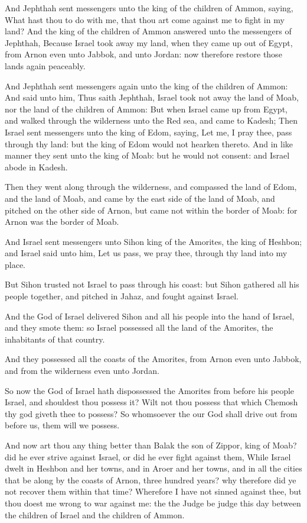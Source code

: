 \Verse And Jephthah sent messengers unto the king of the children of Ammon, saying, What hast thou to do with me, that thou art come against me to fight in my land?  \Verse And the king of the children of Ammon answered unto the messengers of Jephthah, Because Israel took away my land, when they came up out of Egypt, from Arnon even unto Jabbok, and unto Jordan: now therefore restore those lands again peaceably.

\Verse And Jephthah sent messengers again unto the king of the children of Ammon: \Verse And said unto him, Thus saith Jephthah, Israel took not away the land of Moab, nor the land of the children of Ammon: \Verse But when Israel came up from Egypt, and walked through the wilderness unto the Red sea, and came to Kadesh; \Verse Then Israel sent messengers unto the king of Edom, saying, Let me, I pray thee, pass through thy land: but the king of Edom would not hearken thereto.  And in like manner they sent unto the king of Moab: but he would not consent: and Israel abode in Kadesh.

\Verse Then they went along through the wilderness, and compassed the land of Edom, and the land of Moab, and came by the east side of the land of Moab, and pitched on the other side of Arnon, but came not within the border of Moab: for Arnon was the border of Moab.

\Verse And Israel sent messengers unto Sihon king of the Amorites, the king of Heshbon; and Israel said unto him, Let us pass, we pray thee, through thy land into my place.

\Verse But Sihon trusted not Israel to pass through his coast: but Sihon gathered all his people together, and pitched in Jahaz, and fought against Israel.

\Verse And the \LORD God of Israel delivered Sihon and all his people into the hand of Israel, and they smote them: so Israel possessed all the land of the Amorites, the inhabitants of that country.

\Verse And they possessed all the coasts of the Amorites, from Arnon even unto Jabbok, and from the wilderness even unto Jordan.

\Verse So now the \LORD God of Israel hath dispossessed the Amorites from before his people Israel, and shouldest thou possess it?  \Verse Wilt not thou possess that which Chemosh thy god giveth thee to possess? So whomsoever the \LORD our God shall drive out from before us, them will we possess.

\Verse And now art thou any thing better than Balak the son of Zippor, king of Moab? did he ever strive against Israel, or did he ever fight against them, \Verse While Israel dwelt in Heshbon and her towns, and in Aroer and her towns, and in all the cities that be along by the coasts of Arnon, three hundred years? why therefore did ye not recover them within that time?  \Verse Wherefore I have not sinned against thee, but thou doest me wrong to war against me: the \LORD the Judge be judge this day between the children of Israel and the children of Ammon.


